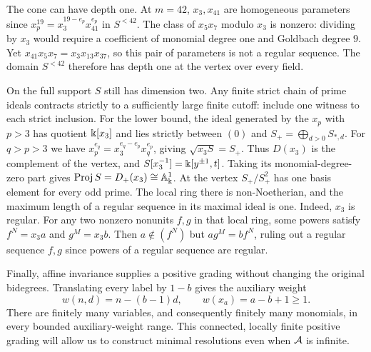 The cone can have depth one. At $m=42$, $x_3,x_{41}$ are homogeneous
parameters since $x_p^{19}=x_3^{19-e_p}x_{41}^{e_p}$ in $S^{<42}$.
The class of $x_5x_7$ modulo $x_3$ is nonzero: dividing by $x_3$ would
require a coefficient of monomial degree one and Goldbach degree $9$.
Yet $x_{41}x_5x_7=x_3x_{13}x_{37}$, so this pair of parameters is
not a regular sequence. The domain $S^{<42}$ therefore has depth
one at the vertex over every field.

On the full support $S$ still has dimension two. Any finite strict
chain of prime ideals contracts strictly to a sufficiently large
finite cutoff: include one witness to each strict inclusion. For the
lower bound, the ideal generated by the $x_p$ with $p>3$ has quotient
$\Bbbk[x_3]$ and lies strictly between $(0)$ and $S_+=\bigoplus_{d>0}S_{*,d}$.
For $q>p>3$ we have $x_p^{e_q}=x_3^{e_q-e_p}x_q^{e_p}$, giving
$\sqrt{x_3 S}=S_+$. Thus $D(x_3)$ is the complement of the vertex,
and $S[x_3^{-1}]=\Bbbk[y^{\pm1},t]$. Taking its monomial-degree-zero part gives
$\operatorname{Proj}S=D_+(x_3)\cong\mathbb A^1_\Bbbk$.
At the vertex $S_+/S_+^2$ has one basis element for every odd prime.
The local ring there is non-Noetherian, and the maximum length of a
regular sequence in its maximal ideal is one. Indeed, $x_3$ is regular.
For any two nonzero nonunits $f,g$ in that local ring, some powers
satisfy $f^N=x_3 a$ and $g^M=x_3 b$. Then $a\notin(f^N)$ but
$a g^M=b f^N$, ruling out a regular sequence $f,g$ since powers of
a regular sequence are regular.

Finally, affine invariance supplies a positive grading without changing
the original bidegrees. Translating every label by $1-b$ gives the
auxiliary weight
\begin{equation}\label{setup:positive-weight}
 w(n,d)=n-(b-1)d,\qquad w(x_a)=a-b+1\ge1.
\end{equation}
There are finitely many variables, and consequently finitely many
monomials, in every bounded auxiliary-weight range. This connected,
locally finite positive grading will allow us to construct minimal
resolutions even when $\mathcal A$ is infinite.
